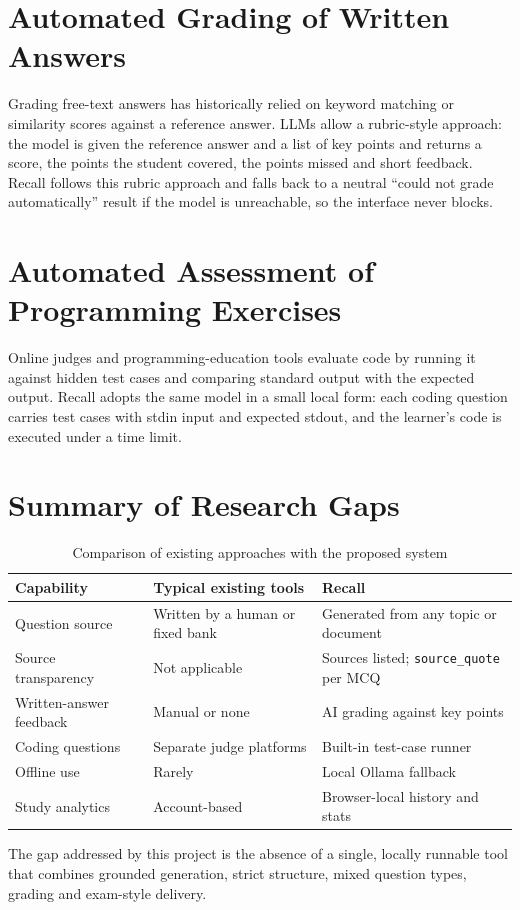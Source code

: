\section{Automated Grading of Written Answers}
Grading free-text answers has historically relied on keyword matching or similarity scores against a reference answer. LLMs allow a rubric-style approach: the model is given the reference answer and a list of key points and returns a score, the points the student covered, the points missed and short feedback. Recall follows this rubric approach and falls back to a neutral ``could not grade automatically'' result if the model is unreachable, so the interface never blocks.

\section{Automated Assessment of Programming Exercises}
Online judges and programming-education tools evaluate code by running it against hidden test cases and comparing standard output with the expected output. Recall adopts the same model in a small local form: each coding question carries test cases with stdin input and expected stdout, and the learner's code is executed under a time limit.

\section{Summary of Research Gaps}
\begin{table}[H]
\centering
\begin{tabularx}{\textwidth}{@{} p{3.6cm} X X @{}}
\toprule
\textbf{Capability} & \textbf{Typical existing tools} & \textbf{Recall} \\
\midrule
Question source & Written by a human or fixed bank & Generated from any topic or document \\
Source transparency & Not applicable & Sources listed; \texttt{source\_quote} per MCQ \\
Written-answer feedback & Manual or none & AI grading against key points \\
Coding questions & Separate judge platforms & Built-in test-case runner \\
Offline use & Rarely & Local Ollama fallback \\
Study analytics & Account-based & Browser-local history and stats \\
\bottomrule
\end{tabularx}
\caption{Comparison of existing approaches with the proposed system}
\label{tab:gap}
\end{table}

The gap addressed by this project is the absence of a single, locally runnable tool that combines grounded generation, strict structure, mixed question types, grading and exam-style delivery.
